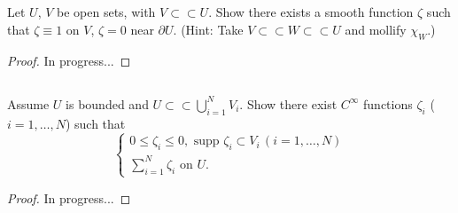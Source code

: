 \documentclass[11pt]{article}
\begin{document}
\setcounter{subsection}{4}
\subsection{}
Let $U$, $V$ be open sets, with $V\subset\subset U$. Show there exists a smooth function $\zeta$ such that
$\zeta \equiv 1$ on $V$, $\zeta = 0$ near $\partial U$. (Hint: Take $V \subset\subset W \subset\subset U$ and mollify $\chi_W$.)
\begin{proof}
In progress...
\end{proof}

\subsection{}
Assume $U$ is bounded and $U \subset\subset \bigcup_{i=1}^{N}V_i$. Show there exist $C^{\infty}$ functions $\zeta_i$ ($i=1,\dots,N$)
such that
\[
\begin{cases}
	0 \leq \zeta_i \leq 0, \text{ supp } \zeta_i \subset V_i \,(i=1,\dots,N)\\
	\sum_{i=1}^{N} \zeta_i \text{ on } U.
\end{cases}
\]
\begin{proof}
In progress...
\end{proof}
\end{document}
